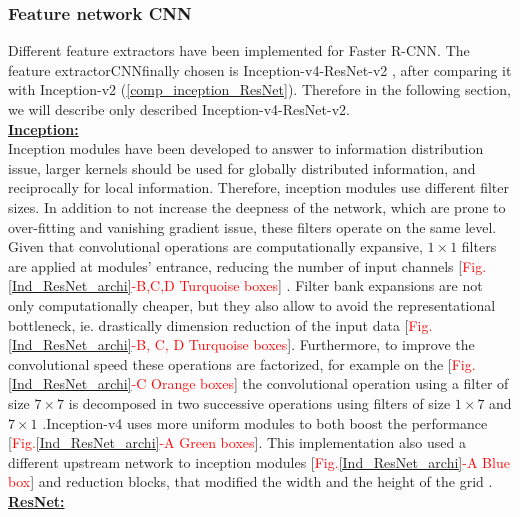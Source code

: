 \documentclass[12pt, french, a4paper]{article} %
\begin{document}
\subsubsection{Feature network CNN}
Different feature extractors have been implemented for Faster \gls{R-CNN}. The feature extractor\gls{CNN}finally chosen is Inception-v4-ResNet-v2 \cite{szegedy2017inception}, after comparing it with Inception-v2 \cite{szegedy2016rethinking} (\ref{comp_inception_ResNet}). Therefore in the following section, we will describe only described Inception-v4-ResNet-v2.
\\
\underline{\textbf{Inception:}}\\
Inception modules have been developed to answer to information distribution issue, larger kernels should be used for globally distributed information, and reciprocally for local information. Therefore, inception modules use different filter sizes. In addition to not increase the deepness of the network, which are prone to over-fitting and vanishing gradient issue, these filters operate on the same level. Given that convolutional operations are computationally expansive, $1\times1$ filters are applied at modules' entrance, reducing the number of input channels [\textcolor{red}{Fig.}\ref{Ind_ResNet_archi}\textcolor{red}{-B,C,D Turquoise boxes}] \cite{szegedy2015going}. Filter bank expansions are not only computationally cheaper, but they also allow to avoid the representational bottleneck, ie. drastically dimension reduction of the input data [\textcolor{red}{Fig.}\ref{Ind_ResNet_archi}\textcolor{red}{-B, C, D Turquoise boxes}]. Furthermore, to improve the convolutional speed these operations are factorized, for example on the [\textcolor{red}{Fig.}\ref{Ind_ResNet_archi}\textcolor{red}{-C Orange boxes}] the convolutional operation using a filter of size $7\times 7$ is decomposed in two successive operations using filters of size $1\times 7 $ and $7 \times 1$ \cite{szegedy2016rethinking}.Inception-v4 \cite{szegedy2017inception} uses more uniform modules to both boost the performance [\textcolor{red}{Fig.}\ref{Ind_ResNet_archi}\textcolor{red}{-A Green boxes}]. This implementation also used a different upstream network to inception modules [\textcolor{red}{Fig.}\ref{Ind_ResNet_archi}\textcolor{red}{-A Blue box}] and reduction blocks, that modified the width and the height of the grid \cite{szegedy2017inception}.\\
\underline{\textbf{ResNet:}}\\
\end{document}
